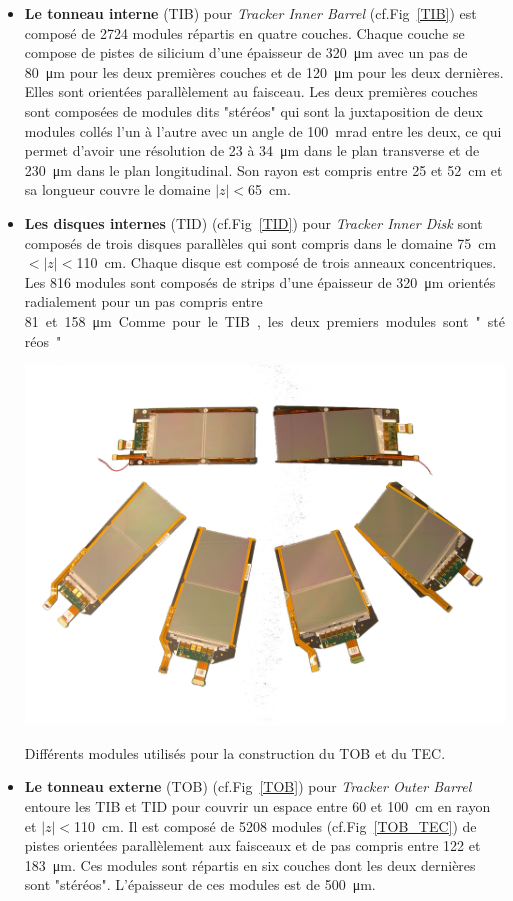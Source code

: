 \begin{itemize}[label=$\bullet$]
\item \textbf{Le tonneau interne} (TIB) pour  \textit{Tracker Inner Barrel} (cf.Fig~\ref{TIB}) est composé de \num{2724} modules répartis en quatre couches. Chaque couche se compose de pistes de silicium d'une épaisseur de \SI{320}{\micro\meter} avec un pas de \SI{80}{\micro\meter} pour les deux premières couches et de \SI{120}{\micro\meter} pour les deux dernières. Elles sont orientées parallèlement au faisceau. Les deux premières couches sont composées de modules dits "stéréos" qui sont la juxtaposition de deux modules collés l'un à l'autre avec un angle de \SI{100}{\milli\radian} entre les deux, ce qui permet d'avoir une résolution de \num{23} à \SI{34}{\micro\m} dans le plan transverse et de \SI{230}{\micro\meter} dans le plan longitudinal. Son rayon est compris entre \num{25} et \SI{52}{\centi\meter} et sa longueur couvre le domaine $|z|<$\SI{65}{\centi\meter}.

\item \textbf{Les disques internes} (TID) (cf.Fig~\ref{TID}) pour \textit{Tracker Inner Disk} sont composés de trois disques parallèles qui sont compris dans le domaine \SI{75}{\centi\meter}$<|z|<$\SI{110}{\centi\meter}. Chaque disque est composé de trois anneaux concentriques. Les \num{816} modules sont composés de strips d'une épaisseur de \SI{320}{\micro\meter} orientés radialement pour un pas compris entre \SI{81} et \SI{158}{\micro\meter}. Comme pour le TIB, les deux premiers modules sont "stéréos".
\marginpar
{
	\centering
	\includegraphics[width=\marginparwidth]{CMS/TOB_TEC.png}
	\captionsetup{type=figure}\caption{Différents modules utilisés pour la construction du TOB et du TEC.}
	\label{TOB_TEC}
}
\item \textbf{Le tonneau externe } (TOB) (cf.Fig~\ref{TOB}) pour \textit{Tracker Outer Barrel} entoure les TIB et TID pour couvrir un espace entre \num{60} et \SI{100}{\centi\meter} en rayon et $|z|<$\SI{110}{\centi\meter}. Il est composé de \num{5208} modules (cf.Fig~\ref{TOB_TEC}) de pistes orientées parallèlement aux faisceaux et de pas compris entre \num{122} et \SI{183}{\micro\meter}. Ces modules sont répartis en six couches dont les deux dernières sont "stéréos". L'épaisseur de ces modules est de \SI{500}{\micro\meter}.   


\end{itemize}
